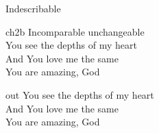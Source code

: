 \begin{song}{Indescribable}
    \begin{songframe}{ch2b}
        Incomparable unchangeable \\
        You see the depths of my heart \\
        And You love me the same \\
        You are amazing, God
    \end{songframe}


    \begin{songframe}{out}
        You see the depths of my heart \\
        And You love me the same \\
        You are amazing, God
    \end{songframe}


\end{song}
\endinput
